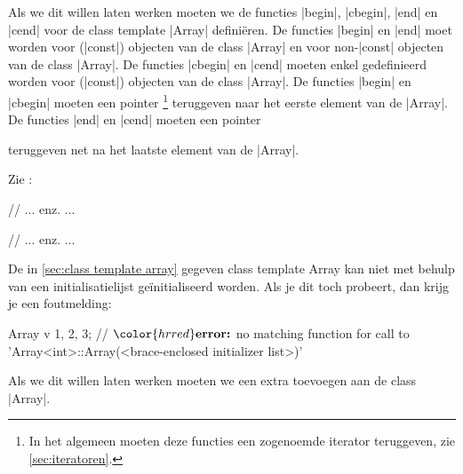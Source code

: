 \begin{cpplstShortInline}
Als we dit willen laten werken moeten we de functies |begin|, |cbegin|, |end| en |cend| voor de class template |Array| definiëren. De functies |begin| en |end| moet  worden voor  (|const|) objecten van de class |Array| en voor non-|const| objecten van de class |Array|. De functies |cbegin| en |cend| moeten enkel gedefinieerd worden voor  (|const|) objecten van de class |Array|. De functies |begin| en |cbegin| moeten een pointer
\footnote{%
    In het algemeen moeten deze functies een zogenoemde iterator teruggeven, zie \cref{sec:iteratoren}.
}
teruggeven naar het eerste element van de |Array|. De functies |end| en |cend| moeten een pointer\addtocounter{footnote}{-1}\addtocounter{Hfootnote}{-1}\footnotemark{}  teruggeven net na het laatste element van de |Array|.

Zie :
\vspace{-.8\baselineskip}
\begin{cpplstfragment}
// ... enz. ...
\end{cpplstfragment}
\vspace{-.8\baselineskip}
\vspace{-.8\baselineskip}
\begin{cpplstfragment}
// ... enz. ...
\end{cpplstfragment}
\vspace{-.8\baselineskip}


\label{sec:Arraymetinitlist}
De in \cref{sec:class template array} gegeven class template Array kan niet met behulp van een initialisatielijst geïnitialiseerd worden. Als je dit toch probeert, dan krijg je een foutmelding:

\begin{cpplstfragment}[mathescape=true]
     Array v {1, 2, 3};
    //  $\color{hrred}\textbf{error:}$ no matching function for call to 'Array<int>::Array(<brace-enclosed initializer list>)'
\end{cpplstfragment}

Als we dit willen laten werken moeten we een extra  toevoegen aan de class |Array|.


\end{cpplstShortInline}

